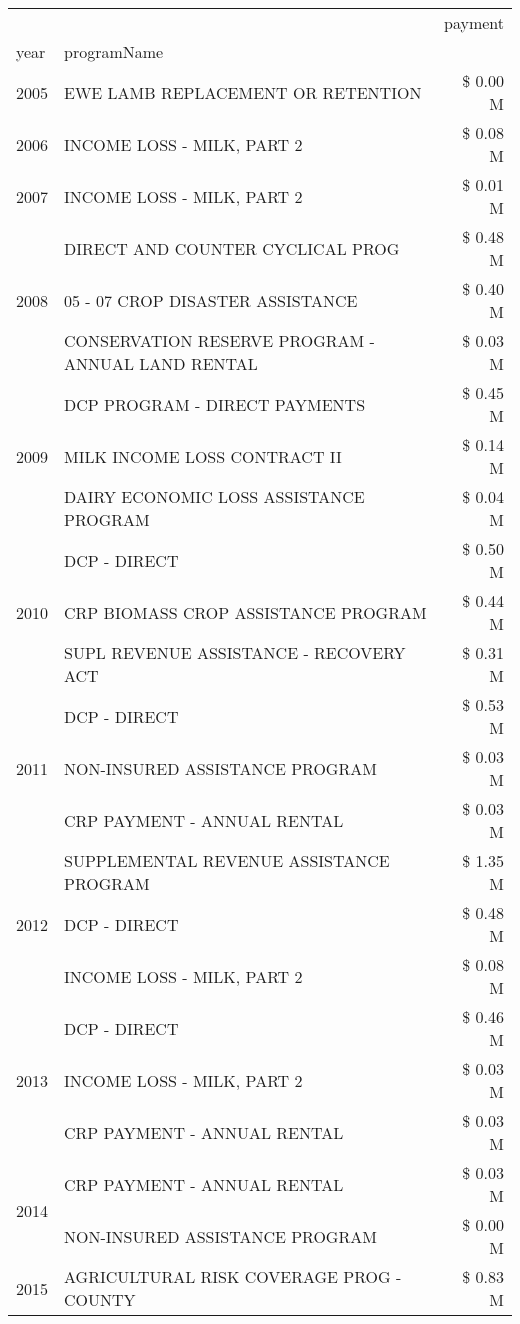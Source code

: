 \begin{tabular}{llr}
\toprule
 &  & payment \\
year & programName &  \\
\midrule
2005 & EWE LAMB REPLACEMENT OR RETENTION & \$ 0.00 M \\
\cline{1-3}
2006 & INCOME LOSS - MILK, PART 2 & \$ 0.08 M \\
\cline{1-3}
2007 & INCOME LOSS - MILK, PART 2 & \$ 0.01 M \\
\cline{1-3}
\multirow[t]{3}{*}{2008} & DIRECT AND COUNTER CYCLICAL PROG & \$ 0.48 M \\
 & 05 - 07 CROP DISASTER ASSISTANCE & \$ 0.40 M \\
 & CONSERVATION RESERVE PROGRAM - ANNUAL LAND RENTAL & \$ 0.03 M \\
\cline{1-3}
\multirow[t]{3}{*}{2009} & DCP PROGRAM - DIRECT PAYMENTS & \$ 0.45 M \\
 & MILK INCOME LOSS CONTRACT II & \$ 0.14 M \\
 & DAIRY ECONOMIC LOSS ASSISTANCE PROGRAM & \$ 0.04 M \\
\cline{1-3}
\multirow[t]{3}{*}{2010} & DCP - DIRECT & \$ 0.50 M \\
 & CRP BIOMASS CROP ASSISTANCE PROGRAM & \$ 0.44 M \\
 & SUPL REVENUE ASSISTANCE - RECOVERY ACT & \$ 0.31 M \\
\cline{1-3}
\multirow[t]{3}{*}{2011} & DCP - DIRECT & \$ 0.53 M \\
 & NON-INSURED ASSISTANCE PROGRAM & \$ 0.03 M \\
 & CRP PAYMENT - ANNUAL RENTAL & \$ 0.03 M \\
\cline{1-3}
\multirow[t]{3}{*}{2012} & SUPPLEMENTAL REVENUE ASSISTANCE PROGRAM & \$ 1.35 M \\
 & DCP - DIRECT & \$ 0.48 M \\
 & INCOME LOSS - MILK, PART 2 & \$ 0.08 M \\
\cline{1-3}
\multirow[t]{3}{*}{2013} & DCP - DIRECT & \$ 0.46 M \\
 & INCOME LOSS - MILK, PART 2 & \$ 0.03 M \\
 & CRP PAYMENT - ANNUAL RENTAL & \$ 0.03 M \\
\cline{1-3}
\multirow[t]{2}{*}{2014} & CRP PAYMENT - ANNUAL RENTAL & \$ 0.03 M \\
 & NON-INSURED ASSISTANCE PROGRAM & \$ 0.00 M \\
\cline{1-3}
\multirow[t]{3}{*}{2015} & AGRICULTURAL RISK COVERAGE PROG - COUNTY & \$ 0.83 M \\

\end{tabular}
